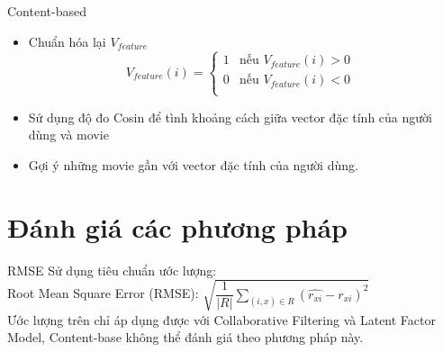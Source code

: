 \documentclass{beamer}
\newcommand{\bi}{\begin{itemize}}
\newcommand{\ei}{\end{itemize}}
\begin{document}
\begin{frame}{Content-based}
\bi
\item Chuẩn hóa lại $V_{feature}$
\begin{displaymath}
V_{feature}(i) = \left\{ \begin{array}{ll}
1 & \textrm{nếu  $V_{feature}(i) > 0$}\\
0 & \textrm{nếu  $V_{feature}(i) < 0$ }\\
\end{array} \right.
\end{displaymath}
\item Sử dụng độ đo Cosin để tình khoảng cách giữa vector đặc tính của người dùng và movie
\item Gợi ý những movie gần với vector đặc tính của người dùng.
\ei
\end{frame}
\section{Đánh giá các phương pháp}
\begin{frame}{RMSE}
Sử dụng tiêu chuẩn ước lượng:\\
Root Mean Square Error (RMSE): $\sqrt{\dfrac{1}{|R|}\sum_{(i,x)\in R} (\hat{r_{xi}}-r_{xi})^2}$\\
Ước lượng trên chỉ áp dụng được với Collaborative Filtering và Latent Factor Model, Content-base không thể đánh giá theo phương pháp này.
\end{frame}
\end{document}
